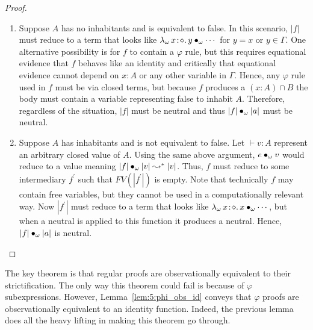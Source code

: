\begin{proof}
\begin{enumerate}
        \item {
            Suppose $A$ has no inhabitants and is equivalent to false.
            In this scenario, $|f|$ must reduce to a term that looks like ${\lambda_\omega}\, x\! : \! \diamond.\, y \bullet_{\omega} \cdots$ for $y = x$ or $y \in \Gamma$.
            One alternative possibility is for $f$ to contain a $\varphi$ rule, but this requires equational evidence that $f$ behaves like an identity and critically that equational evidence cannot depend on $x : A$ or any other variable in $\Gamma$.
            Hence, any $\varphi$ rule used in $f$ must be via closed terms, but because $f$ produces a $(x : A) \cap B$ the body must contain a variable representing false to inhabit $A$.
            Therefore, regardless of the situation, $|f|$ must be neutral and thus $|f| \bullet_{\omega} |a|$ must be neutral.
        }
        \item {
            Suppose $A$ has inhabitants and is not equivalent to false.
            Let $\vdash v : A$ represent an arbitrary closed value of $A$.
            Using the same above argument, $e \bullet_{\omega} v$ would reduce to a value meaning $|f| \bullet_{\omega} |v| \leadsto^* |v|$.
            Thus, $f$ must reduce to some intermediary $f^\prime$ such that $FV(|f^\prime|)$ is empty.
            Note that technically $f$ may contain free variables, but they cannot be used in a computationally relevant way.
            Now $|f^\prime|$ must reduce to a term that looks like ${\lambda_\omega}\, x\! : \! \diamond.\, x \bullet_{\omega} \cdots$, but when a neutral is applied to this function it produces a neutral.
            Hence, $|f| \bullet_{\omega} |a|$ is neutral.
        }
    \end{enumerate}
\end{proof}

The key theorem is that regular proofs are observationally equivalent to their strictification.
The only way this theorem could fail is because of $\varphi$ subexpressions.
However, Lemma~\ref{lem:5:phi_obs_id} conveys that $\varphi$ proofs are observationally equivalent to an identity function.
Indeed, the previous lemma does all the heavy lifting in making this theorem go through.

